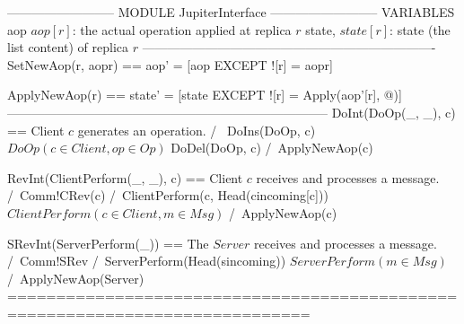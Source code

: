 \documentclass{article}
\begin{document}
\begin{tla}
-------------------------- MODULE JupiterInterface --------------------------
VARIABLES 
    aop     \* $aop[r]$: the actual operation applied at replica $r$
    state,  \* $state[r]$: state (the list content) of replica $r$
----------------------------------------------------------------------
SetNewAop(r, aopr) == aop' = [aop EXCEPT ![r] = aopr]

ApplyNewAop(r) == state' = [state EXCEPT ![r] = Apply(aop'[r], @)]
-----------------------------------------------------------------------------
DoInt(DoOp(_, _), c) == \* Client $c$ generates an operation.
    /\ \/ DoIns(DoOp, c)\* $DoOp(c \in Client, op \in Op)$
       \/ DoDel(DoOp, c)
    /\ ApplyNewAop(c)
    
RevInt(ClientPerform(_, _), c) == \* Client $c$ receives and processes a message.
    /\ Comm!CRev(c)
    /\ ClientPerform(c, Head(cincoming[c])) \* $ClientPerform(c \in Client, m \in Msg)$
    /\ ApplyNewAop(c)

SRevInt(ServerPerform(_)) == \* The $Server$ receives and processes a message.
    /\ Comm!SRev
    /\ ServerPerform(Head(sincoming)) \* $ServerPerform(m \in Msg)$
    /\ ApplyNewAop(Server)
=============================================================================
\end{tla}
\end{document}
